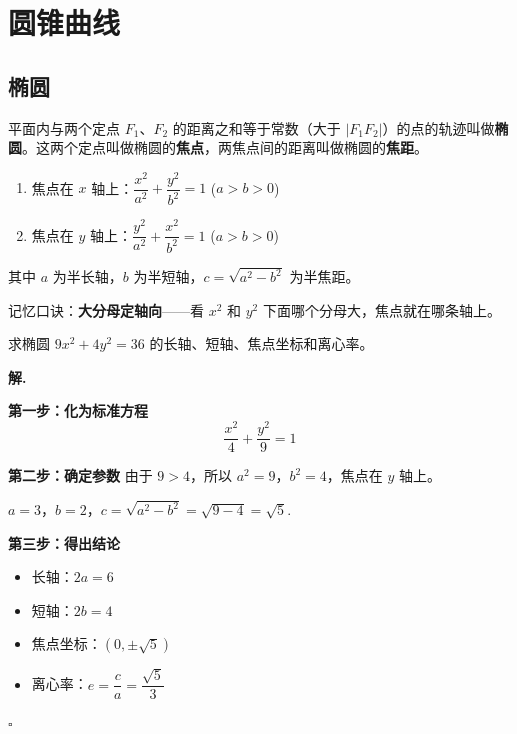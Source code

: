 \chapter{圆锥曲线}

\section{椭圆}

\begin{definition}[椭圆]
平面内与两个定点 $F_1$、$F_2$ 的距离之和等于常数（大于 $|F_1F_2|$）的点的轨迹叫做\textbf{椭圆}。这两个定点叫做椭圆的\textbf{焦点}，两焦点间的距离叫做椭圆的\textbf{焦距}。
\end{definition}

\begin{theorem}[椭圆的标准方程]
\begin{enumerate}
    \item 焦点在 $x$ 轴上：$\dfrac{x^2}{a^2} + \dfrac{y^2}{b^2} = 1$ \quad ($a > b > 0$)
    \item 焦点在 $y$ 轴上：$\dfrac{y^2}{a^2} + \dfrac{x^2}{b^2} = 1$ \quad ($a > b > 0$)
\end{enumerate}
其中 $a$ 为半长轴，$b$ 为半短轴，$c = \sqrt{a^2 - b^2}$ 为半焦距。
\end{theorem}

\begin{note}
记忆口诀：\textbf{大分母定轴向}——看 $x^2$ 和 $y^2$ 下面哪个分母大，焦点就在哪条轴上。
\end{note}

\begin{example}
求椭圆 $9x^2 + 4y^2 = 36$ 的长轴、短轴、焦点坐标和离心率。
\end{example}

\textbf{解.}

\textbf{第一步：化为标准方程}
\[ \frac{x^2}{4} + \frac{y^2}{9} = 1 \]

\textbf{第二步：确定参数}
由于 $9 > 4$，所以 $a^2 = 9$，$b^2 = 4$，焦点在 $y$ 轴上。

$a = 3$，$b = 2$，$c = \sqrt{a^2 - b^2} = \sqrt{9 - 4} = \sqrt{5}$.

\textbf{第三步：得出结论}
\begin{itemize}
    \item 长轴：$2a = 6$
    \item 短轴：$2b = 4$
    \item 焦点坐标：$(0, \pm\sqrt{5})$
    \item 离心率：$e = \dfrac{c}{a} = \dfrac{\sqrt{5}}{3}$
\end{itemize}
\hfill $\square$

